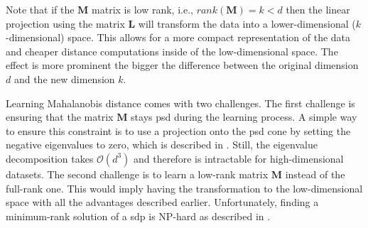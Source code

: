 \documentclass[12pt,a4paper]{report}
\begin{document}
Note that if the $\bm{M}$ matrix is low rank, i.e., $rank(\bm{M})=k<d$ then the linear projection using the matrix $\bm{L}$ will transform the data into a lower-dimensional ($k$-dimensional) space. This allows for a more compact representation of the data and cheaper distance computations inside of the low-dimensional space. The effect is more prominent the bigger the difference between the original dimension $d$ and the new dimension $k$.

Learning Mahalanobis distance comes with two challenges. The first challenge is ensuring that the matrix $\bm{M}$ stays \ac{psd} during the learning process. A simple way to ensure this constraint is to use a projection onto the \ac{psd} cone by setting the negative eigenvalues to zero, which is described in \citep{qian2015efficient}. Still, the eigenvalue decomposition takes $\mathcal{O}(d^3)$ and therefore is intractable for high-dimensional datasets. The second challenge is to learn a low-rank matrix $\bm{M}$ instead of the full-rank one. This would imply having the transformation to the low-dimensional space with all the advantages described earlier. Unfortunately, finding a minimum-rank solution of a \ac{sdp} is NP-hard as described in \citep{lemon2016low}.


\end{document}
